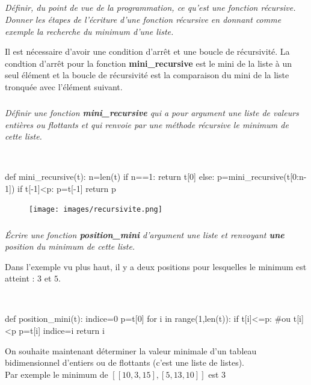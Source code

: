 \documentclass[10pt,fleqn]{article} %
\begin{document}
\subparagraph{}
\textit{Définir, du point de vue de la programmation, ce qu'est une fonction récursive. Donner les étapes de l'écriture d'une fonction récursive en donnant comme exemple la recherche du minimum d'une liste.}

\ifprof
\begin{corrige}
Il est nécessaire d'avoir une condition d'arrêt et une boucle de récursivité. La condtion d'arrêt pour la fonction \textbf{mini\_recursive} est le mini de la liste à un seul élément et la boucle de récursivité est la comparaison du mini de la liste tronquée avec l'élément suivant.
\end{corrige}
\else
\fi
	
\subparagraph{}
\textit{Définir une fonction \textbf{mini\_recursive} qui a pour argument une liste de valeurs entières ou flottants et qui renvoie par une méthode récursive le \emph{minimum} de cette liste.}

\ifprof
\begin{corrige}~\
\begin{python}
def mini_recursive(t):
    n=len(t)
    if n==1:
        return t[0]
    else:
        p=mini_recursive(t[0:n-1])
        if t[-1]<p:
            p=t[-1]
        return p
\end{python}
\end{corrige}
\else
\fi

\ifprof
\begin{corrige}
\begin{figure}[h]
	\centering
		\texttt{[image: images/recursivite.png]}
\end{figure}
\end{corrige}
\else
\fi
  
 \subparagraph{}
\textit{ Écrire une fonction \textbf{position\_mini} d'argument une liste et renvoyant \textbf{une} position
  du minimum de cette liste.\\}
  
 Dans  l'exemple vu plus haut,  il y a deux positions pour lesquelles
  le minimum est atteint : $3$ et $5$.
	
\ifprof
\begin{corrige}~\
\begin{python}
def position_mini(t):
    indice=0
    p=t[0]
    for i in range(1,len(t)):
        if t[i]<=p: #ou t[i]<p
            p=t[i]
            indice=i
    return i
\end{python}
\end{corrige}
\else
\fi
  
On souhaite maintenant déterminer la valeur minimale d'un tableau
  bidimensionnel d'entiers ou de flottants (c'est une liste de listes).\\
  Par exemple le minimum de $[[10,3,15],[5,13,10]]$ est $3$
  
\end{document}

